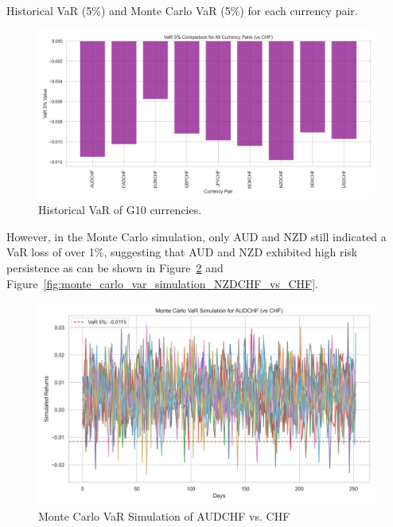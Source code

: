 \documentclass{article}
\begin{document}
\begin{table}[H]
\centering
\caption{Historical VaR (5\%) and Monte Carlo VaR (5\%) for each currency pair.} 
\label{tab:var}
\end{table}

\begin{figure}[H]
    \centering   \includegraphics[width=0.75\linewidth]{reports/figures/var_5_percent_comparison_plot.png}
    \caption{Historical VaR of G10 currencies.}
    \label{fig:historical_VaR}
\end{figure}

However, in the Monte Carlo simulation, only AUD and NZD still indicated a VaR loss of over 1\%, suggesting that AUD and NZD exhibited high risk persistence as can be shown in Figure~\ref{fig:monte_carlo_var_simulation_AUDCHF_vs_CHF} and Figure~\ref{fig:monte_carlo_var_simulation_NZDCHF_vs_CHF}.

\begin{figure}[H]
    \centering   
    \includegraphics[width=0.75\linewidth]{reports/figures/monte_carlo_var_simulation_AUDCHF_vs_CHF.png}
    \caption{Monte Carlo VaR Simulation of AUDCHF vs. CHF}  \label{fig:monte_carlo_var_simulation_AUDCHF_vs_CHF}
\end{figure}
\end{document}
